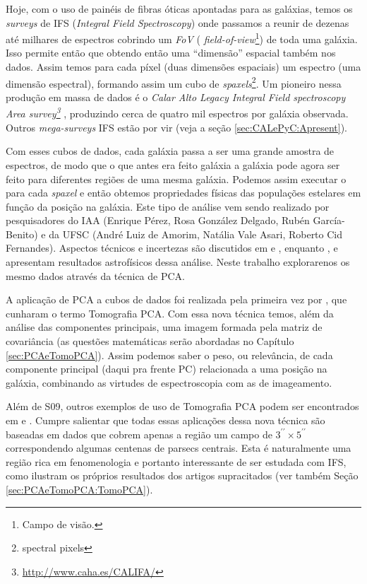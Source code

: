 Hoje, com o uso de painéis de fibras óticas apontadas para as galáxias, temos os {\em surveys} de IFS ({\em Integral
Field Spectroscopy}) onde passamos a reunir de dezenas até milhares de espectros cobrindo um {\em FoV} ({\em
field-of-view}\footnote{Campo de visão.}) de toda uma galáxia. Isso permite então que obtendo então uma ``dimensão''
espacial também nos dados. Assim temos para cada píxel (duas dimensões espaciais) um espectro (uma dimensão espectral),
formando assim um cubo de {\em spaxels}\footnote{spectral pixels}. Um pioneiro nessa produção em massa de dados é o {\em
Calar Alto Legacy Integral Field spectroscopy Area survey\footnote{\url{http://www.caha.es/CALIFA/}}} \citep[CALIFA;
][]{CALIFAPresent2012}, produzindo cerca de quatro mil espectros por galáxia observada. Outros {\em mega-surveys} IFS
estão por vir (veja a seção \ref{sec:CALePyC:Apresent}).

Com esses cubos de dados, cada galáxia passa a ser uma grande amostra de espectros, de modo que o que antes era feito
galáxia a galáxia pode agora ser feito para diferentes regiões de uma mesma galáxia. Podemos assim executar o \starlight
para cada {\em spaxel} e então obtemos propriedades físicas das populações estelares em função da posição na galáxia.
Este tipo de análise vem sendo realizado por pesquisadores do IAA (Enrique Pérez, Rosa González Delgado, Rubén
García-Benito) e da UFSC (André Luiz de Amorim, Natália Vale Asari, Roberto Cid Fernandes). Aspectos técnicos e
incertezas são discutidos em \citet[][CF13 daqui pra frente]{CidFernandes2013} e \citet{CidFernandes2014}, enquanto
\citet{Perez2013}, e \citet{GonzalezDelgado2014} apresentam resultados astrofísicos dessa análise. Neste trabalho
explorarenos os mesmo dados através da técnica de PCA.

A aplicação de PCA a cubos de dados foi realizada pela primeira vez por \citet[][S09 daqui pra frente]{Steiner2009},
que cunharam o termo Tomografia PCA. Com essa nova técnica temos, além da análise das componentes principais, uma imagem formada pela matriz
de covariância (as questões matemáticas serão abordadas no Capítulo \ref{sec:PCAeTomoPCA}). Assim podemos saber o peso,
ou relevância, de cada componente principal (daqui pra frente PC) relacionada a uma posição na galáxia, combinando as
virtudes de espectroscopia com as de imageamento.

Além de S09, outros exemplos de uso de Tomografia PCA podem ser encontrados em \citet{Riffel2011} e \citet{Ricci2011}.
Cumpre salientar que todas essas aplicações dessa nova técnica são baseadas em dados que cobrem apenas a região um campo
de $3^{\prime\prime} \times 5^{\prime\prime}$ correspondendo algumas centenas de parsecs centrais. Esta é naturalmente
uma região rica em fenomenologia e portanto interessante de ser estudada com IFS, como ilustram os próprios resultados
dos artigos supracitados (ver também Seção \ref{sec:PCAeTomoPCA:TomoPCA}).

